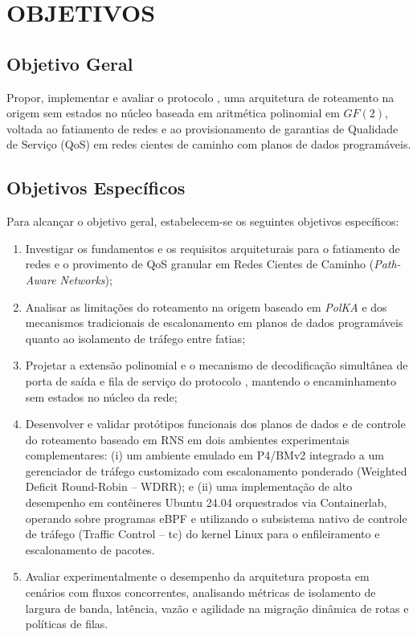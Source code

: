 \section{OBJETIVOS}

\subsection{Objetivo Geral}

Propor, implementar e avaliar o protocolo \nome, uma arquitetura de roteamento na origem sem estados no núcleo baseada em aritmética polinomial em $GF(2)$, voltada ao fatiamento de redes e ao provisionamento de garantias de Qualidade de Serviço (QoS) em redes cientes de caminho com planos de dados programáveis.

\subsection{Objetivos Específicos}

Para alcançar o objetivo geral, estabelecem-se os seguintes objetivos específicos:

\begin{enumerate}
    \item Investigar os fundamentos e os requisitos arquiteturais para o fatiamento de redes e o provimento de QoS granular em Redes Cientes de Caminho (\textit{Path-Aware Networks});
    \item Analisar as limitações do roteamento na origem baseado em \textit{PolKA} e dos mecanismos tradicionais de escalonamento em planos de dados programáveis quanto ao isolamento de tráfego entre fatias;
    \item Projetar a extensão polinomial e o mecanismo de decodificação simultânea de porta de saída e fila de serviço do protocolo \nome, mantendo o encaminhamento sem estados no núcleo da rede;
    \item Desenvolver e validar protótipos funcionais dos planos de dados e de controle do roteamento baseado em RNS em dois ambientes experimentais complementares: (i) um ambiente emulado em P4/BMv2 integrado a um gerenciador de tráfego customizado com escalonamento ponderado (Weighted Deficit Round-Robin – WDRR); e (ii) uma implementação de alto desempenho em contêineres Ubuntu 24.04 orquestrados via Containerlab, operando sobre programas eBPF e utilizando o subsistema nativo de controle de tráfego (Traffic Control – tc) do kernel Linux para o enfileiramento e escalonamento de pacotes.
    \item Avaliar experimentalmente o desempenho da arquitetura proposta em cenários com fluxos concorrentes, analisando métricas de isolamento de largura de banda, latência, vazão e agilidade na migração dinâmica de rotas e políticas de filas.
\end{enumerate}

